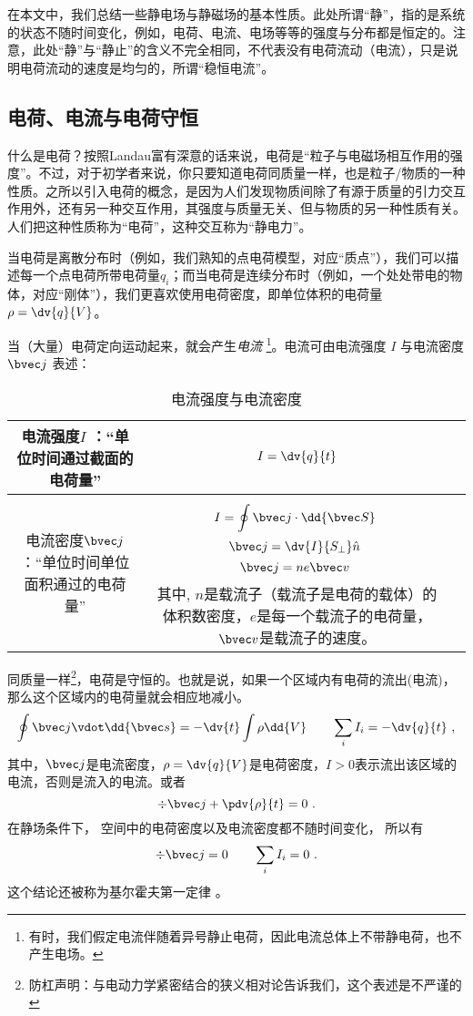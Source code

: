 
\begin{issues}
\issueDraft
\end{issues}
在本文中，我们总结一些静电场与静磁场的基本性质。此处所谓“静”，指的是系统的状态不随时间变化，例如，电荷、电流、电场等等的强度与分布都是恒定的。注意，此处“静”与“静止”的含义不完全相同，不代表没有电荷流动（电流），只是说明电荷流动的速度是均匀的，所谓“稳恒电流”。

\subsection{电荷、电流与电荷守恒}
什么是电荷？按照Landau富有深意的话来说，电荷是“粒子与电磁场相互作用的强度”。不过，对于初学者来说，你只要知道电荷同质量一样，也是粒子/物质的一种性质。之所以引入电荷的概念，是因为人们发现物质间除了有源于质量的引力交互作用外，还有另一种交互作用，其强度与质量无关、但与物质的另一种性质有关。人们把这种性质称为“电荷”，这种交互称为“静电力”。

当电荷是离散分布时（例如，我们熟知的点电荷模型，对应“质点”），我们可以描述每一个点电荷所带电荷量$q_i$；而当电荷是连续分布时（例如，一个处处带电的物体，对应“刚体”），我们更喜欢使用电荷密度，即单位体积的电荷量$\rho = \dv{q}{V}$。

当（大量）电荷定向运动起来，就会产生\textsl{电流} \footnote{有时，我们假定电流伴随着异号静止电荷，因此电流总体上不带静电荷，也不产生电场。}。电流可由电流强度 $I$ 与电流密度 $\bvec j$ 表述：

\begin{table}[ht]
\centering
\caption{电流强度与电流密度}\label{tab_estfid3}
\begin{tabular}{|c|c|c|}
\hline
电流强度$I$ ：“单位时间通过截面的电荷量” & $I = \dv{q}{t}$ \\
\hline
电流密度$\bvec j$ ：“单位时间单位面积通过的电荷量” & $$I = \oint \bvec j \cdot \dd {\bvec S}~$$ $$\bvec j= \dv{I}{S_\perp} \hat n~$$ $$\bvec j = n e \bvec v~$$其中, $n$是载流子（载流子是电荷的载体）的体积数密度，$e$是每一个载流子的电荷量，$\bvec v$是载流子的速度。 \\
\hline
\end{tabular}
\end{table}


同质量一样\footnote{防杠声明：与电动力学紧密结合的狭义相对论告诉我们，这个表述是不严谨的}，电荷是守恒的。也就是说，如果一个区域内有电荷的流出(电流)，那么这个区域内的电荷量就会相应地减小。
$$
\oint \bvec j \vdot \dd{\bvec s}  =  - \dv{t} \int \rho \dd{V} \qquad \sum_i I_i = -\dv{q}{t}~,
$$
其中，$\bvec j$是电流密度，$\rho = \dv{q}{V}$是电荷密度，$I>0$表示流出该区域的电流，否则是流入的电流。或者
$$
\div \bvec j + \pdv{\rho}{t} = 0~.
$$
在静场条件下， 空间中的电荷密度以及电流密度都不随时间变化， 所以有
$$
\div \bvec j = 0 \qquad \sum_i I_i = 0~.$$
这个结论还被称为基尔霍夫第一定律 。


